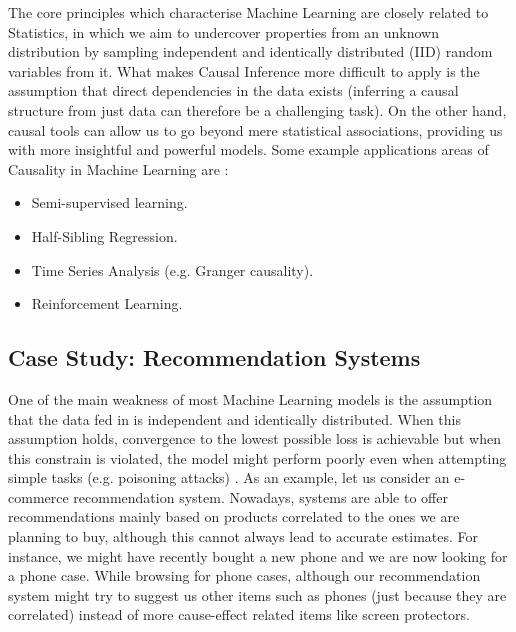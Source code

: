 The core principles which characterise Machine Learning are closely related to Statistics, in which we aim to undercover properties from an unknown distribution by sampling independent and identically distributed (IID) random variables from it. What makes Causal Inference more difficult to apply is the assumption that direct dependencies in the data exists (inferring a causal structure from just data can therefore be a challenging task). On the other hand, causal tools can allow us to go beyond mere statistical associations, providing us with more insightful and powerful models. Some example applications areas of Causality in Machine Learning are \cite{ml_peters}:
\begin{itemize}
    \item Semi-supervised learning.
    \item Half-Sibling Regression.
    \item Time Series Analysis (e.g. Granger causality).
    \item Reinforcement Learning.
\end{itemize}

\subsection{Case Study: Recommendation Systems}

One of the main weakness of most Machine Learning models is the assumption that the data fed in is independent and identically distributed. When this assumption holds, convergence to the lowest possible loss is achievable but when this constrain is violated, the model might perform poorly even when attempting simple tasks (e.g. poisoning attacks) \cite{six}.
As an example, let us consider an e-commerce recommendation system. Nowadays, systems are able to offer recommendations mainly based on products correlated to the ones we are planning to buy, although this cannot always lead to accurate estimates. For instance, we might have recently bought a new phone and we are now looking for a phone case. While browsing for phone cases, although our recommendation system might try to suggest us other items such as phones (just because they are correlated) instead of more cause-effect related items like screen protectors.